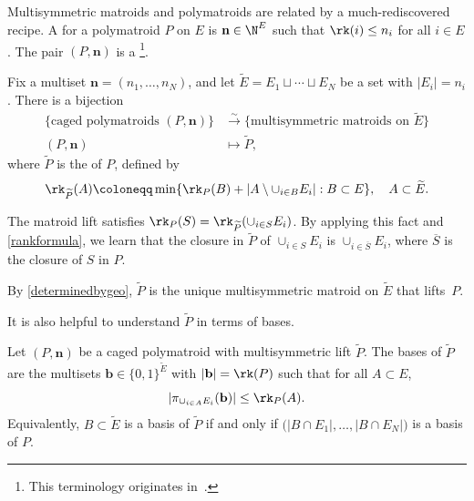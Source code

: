 \subsection{}
Multisymmetric matroids and polymatroids are related by a much-rediscovered \cite{H72,N86,L77,M75,BCF22,CHLSW22} recipe.
A  for a polymatroid $P$ on $E$ is $\mathbf n \in \N^E$ such that $\rk(i) \leq n_i$ for all $i \in E$.
The pair $(P, \mathbf n)$ is a \footnote{This terminology originates in~\cite{EL23}.}.
\begin{thmdfn}\label{lift}
  Fix a multiset $\mathbf n = (n_1, \ldots, n_N)$, and let $\widetilde E = E_1 \sqcup \cdots \sqcup E_N$ be a set with $|E_i| = n_i$.
  There is a bijection
  \begin{align*}
    \{\text{caged polymatroids $(P, \mathbf n)$}\} &\overset{\sim}{\longrightarrow} \{\text{multisymmetric matroids on $\widetilde E$}\} \\
    (P, \mathbf n) &\longmapsto \widetilde P,
  \end{align*}
  where $\widetilde P$ is the  of $P$, defined by
    \[
    \rk_{\widetilde P}(A) \coloneqq  \min \{\rk_P(B) + |A \setminus \cup_{i \in B} E_i| : B \subset E \}, \quad A \subset \widetilde E.
  \]
\end{thmdfn}
\begin{rema}\label{rmk:liftclosure}
  The matroid lift satisfies $\rk_P(S) = \rk_{\widetilde P}(\cup_{i \in S} E_i)$.
  By applying this fact and \cref{rankformula}, we learn that the closure in $\widetilde P$ of $\cup_{i \in S} E_i$ is $\cup_{i \in \overline S} E_i$, where $\overline S$ is the closure of $S$ in $P$.
  
\end{rema}
\begin{rema}
   By \cref{determinedbygeo}, $\widetilde P$ is the unique multisymmetric matroid on $\widetilde E$ that lifts~$P$.
\end{rema}
It is also helpful to understand $\widetilde P$ in terms of bases.
\begin{prop}\label{liftbases}
  Let $(P, \mathbf n)$ be a caged polymatroid with multisymmetric lift $\widetilde P$.
  The bases of $\widetilde P$ are the multisets $\mathbf b \in \{0,1\}^{\widetilde E}$ with $|\mathbf b| = \rk(P)$ such that for all $A \subset E$,
  \[
    |\pi_{\cup_{i \in A} E_i}(\mathbf b)| \leq \rk_P(A).
  \]
  Equivalently, $B \subset \widetilde E$ is a basis of $\widetilde P$ if and only if $\big(|B \cap E_1|, \ldots, |B \cap E_N|\big)$ is a basis of $P$.
\end{prop}
